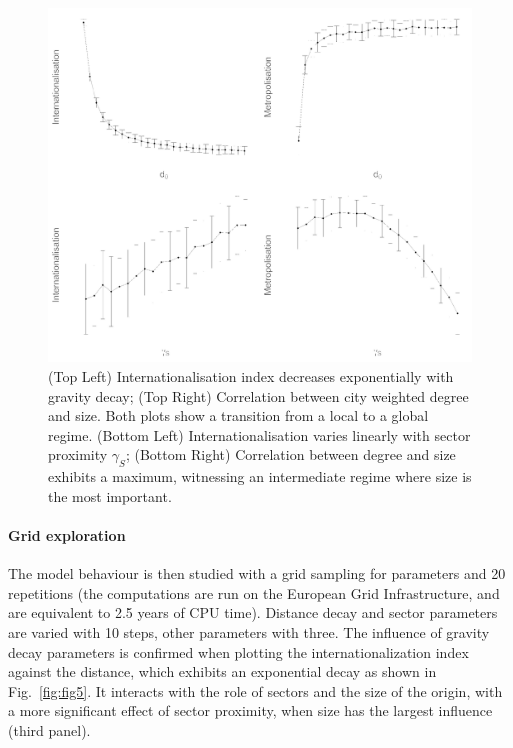 \documentclass[10pt,letterpaper]{article}
\begin{document}
\begin{figure}
	\begin{center}
	    \includegraphics[width=\linewidth]{figures/Fig4.png}
	\end{center}
    \caption{(Top Left) Internationalisation index decreases exponentially with gravity decay; (Top Right) Correlation between city weighted degree and size. Both plots show a transition from a local to a global regime. (Bottom Left) Internationalisation varies linearly with sector proximity $\gamma_S$; (Bottom Right) Correlation between degree and size exhibits a maximum, witnessing an intermediate regime where size is the most important. \label{fig:fig4}}
\end{figure}



\paragraph{Grid exploration}

The model behaviour is then studied with a grid sampling for parameters and 20 repetitions (the computations are run on the European Grid Infrastructure, and are equivalent to 2.5 years of CPU time). Distance decay and sector  parameters are varied with 10 steps, other parameters with three. The influence of gravity decay parameters is confirmed when plotting the internationalization index against the distance, which exhibits an exponential decay as shown in Fig.~\ref{fig:fig5}. It interacts with the role of sectors and the size of the origin, with a more significant effect of sector proximity, when size has the largest influence (third panel).
\end{document}
